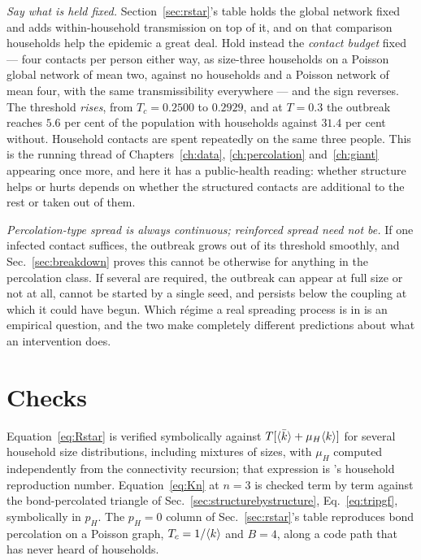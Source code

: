 \emph{Say what is held fixed.} Section~\ref{sec:rstar}'s table holds the global
network fixed and adds within-household transmission on top of it, and on that
comparison households help the epidemic a great deal. Hold instead the
\emph{contact budget} fixed --- four contacts per person either way, as
size-three households on a Poisson global network of mean two, against no
households and a Poisson network of mean four, with the same transmissibility
everywhere --- and the sign reverses. The threshold \emph{rises}, from
$T_{c}=0.2500$ to $0.2929$, and at $T=0.3$ the outbreak reaches $5.6$ per cent of the
population with households against $31.4$ per cent without. Household contacts are
spent repeatedly on the same three people. This is the running thread of
Chapters~\ref{ch:data}, \ref{ch:percolation} and~\ref{ch:giant} appearing once
more, and here it has a public-health reading: whether structure helps or hurts
depends on whether the structured contacts are additional to the rest or taken
out of them.

\emph{Percolation-type spread is always continuous; reinforced spread need not
be.} If one infected contact suffices, the outbreak grows out of its
threshold smoothly, and Sec.~\ref{sec:breakdown} proves this cannot be
otherwise for anything in the percolation class. If several are required, the
outbreak can appear at full size or not at all, cannot be started by a single
seed, and persists below the coupling at which it could have begun. Which r\'egime
a real spreading process is in is an empirical question, and the two make
completely different predictions about what an intervention does.

\section{Checks}
\label{sec:epidemics-checks}

Equation~\eqref{eq:Rstar} is verified symbolically against
$T[\langle \bar k \rangle+\mu_{H}\langle k \rangle]$ for several household size distributions,
including mixtures of sizes, with $\mu_{H}$ computed independently from the
connectivity recursion; that expression is \citeauthor{ball1997}'s household
reproduction number. Equation~\eqref{eq:Kn} at $n=3$ is checked term by term
against the bond-percolated triangle of Sec.~\ref{sec:structurebystructure},
Eq.~\eqref{eq:tripgf}, symbolically in $p_{H}$. The $p_{H}=0$ column of
Sec.~\ref{sec:rstar}'s table reproduces bond percolation on a Poisson graph,
$T_{c}=1/\langle k \rangle$ and $B=4$, along a code path that has never heard of
households.

